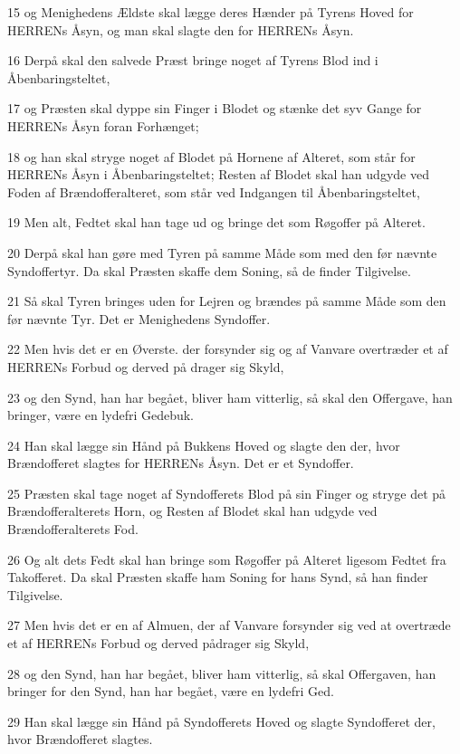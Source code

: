 \par 15 og Menighedens Ældste skal lægge deres Hænder på Tyrens Hoved for HERRENs Åsyn, og man skal slagte den for HERRENs Åsyn.
\par 16 Derpå skal den salvede Præst bringe noget af Tyrens Blod ind i Åbenbaringsteltet,
\par 17 og Præsten skal dyppe sin Finger i Blodet og stænke det syv Gange for HERRENs Åsyn foran Forhænget;
\par 18 og han skal stryge noget af Blodet på Hornene af Alteret, som står for HERRENs Åsyn i Åbenbaringsteltet; Resten af Blodet skal han udgyde ved Foden af Brændofferalteret, som står ved Indgangen til Åbenbaringsteltet,
\par 19 Men alt, Fedtet skal han tage ud og bringe det som Røgoffer på Alteret.
\par 20 Derpå skal han gøre med Tyren på samme Måde som med den før nævnte Syndoffertyr. Da skal Præsten skaffe dem Soning, så de finder Tilgivelse.
\par 21 Så skal Tyren bringes uden for Lejren og brændes på samme Måde som den før nævnte Tyr. Det er Menighedens Syndoffer.
\par 22 Men hvis det er en Øverste. der forsynder sig og af Vanvare overtræder et af HERRENs Forbud og derved på drager sig Skyld,
\par 23 og den Synd, han har begået, bliver ham vitterlig, så skal den Offergave, han bringer, være en lydefri Gedebuk.
\par 24 Han skal lægge sin Hånd på Bukkens Hoved og slagte den der, hvor Brændofferet slagtes for HERRENs Åsyn. Det er et Syndoffer.
\par 25 Præsten skal tage noget af Syndofferets Blod på sin Finger og stryge det på Brændofferalterets Horn, og Resten af Blodet skal han udgyde ved Brændofferalterets Fod.
\par 26 Og alt dets Fedt skal han bringe som Røgoffer på Alteret ligesom Fedtet fra Takofferet. Da skal Præsten skaffe ham Soning for hans Synd, så han finder Tilgivelse.
\par 27 Men hvis det er en af Almuen, der af Vanvare forsynder sig ved at overtræde et af HERRENs Forbud og derved pådrager sig Skyld,
\par 28 og den Synd, han har begået, bliver ham vitterlig, så skal Offergaven, han bringer for den Synd, han har begået, være en lydefri Ged.
\par 29 Han skal lægge sin Hånd på Syndofferets Hoved og slagte Syndofferet der, hvor Brændofferet slagtes.
